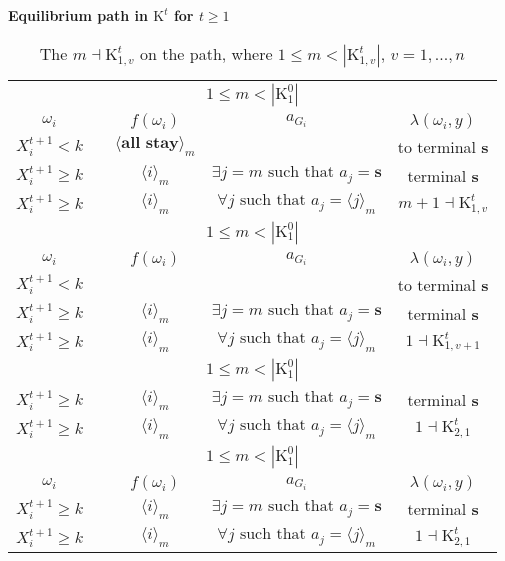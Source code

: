 \documentclass[12pt,letter]{article}
\newcommand{\Kappa}{\mathrm{K}}
\theoremstyle{definition}
\theoremstyle{remark}
\theoremstyle{claim}
\begin{document}
\noindent \textbf{Equilibrium path in $\Kappa^t$ for $t\geq 1$}
\begin{table}[!htbp]
\caption{The $m\dashv\Kappa^t_{1,v}$ on the path, where $1\leq m<|\Kappa^t_{1,v}|$, $v=1,...,n$}
\begin{center}
\begin{tabular}{c c | c | c | c}
\multicolumn{5}{c}{$1\leq m < |\Kappa^0_1|$}\\
$\omega_i$ 	 & 	   &	$f(\omega_i)$  &	$a_{G_i}$ & $\lambda(\omega_i,y)$ \\
\hline
\hline
$X^{t+1}_i<k$  	&                                & $\langle \textbf{all stay} \rangle_m$		&				 				& to terminal \textbf{s}\\
$X^{t+1}_i\geq k$  	& 						& $\langle i \rangle_m$		&  $\exists j=m\text{ such that } a_j=\textbf{s}$	& terminal \textbf{s}\\
$X^{t+1}_i\geq k$ 	& 						& $\langle i \rangle_m$		&  $\forall j\text{ such that } a_j= \langle j \rangle_m$	& $m+1\dashv \Kappa^t_{1,v}$\\
\hline
\multicolumn{5}{c}{$1\leq m < |\Kappa^0_1|$}\\
$\omega_i$ 	 & 	   &	$f(\omega_i)$  &	$a_{G_i}$ & $\lambda(\omega_i,y)$ \\
\hline
\hline
$X^{t+1}_i<k$  	&                                & 											&				 				& to terminal \textbf{s}\\
$X^{t+1}_i\geq k$ & 						& $\langle i \rangle_m$		&  $\exists j=m\text{ such that } a_j=\textbf{s}$	& terminal \textbf{s}\\
$X^{t+1}_i\geq k$ 	& 						& $\langle i \rangle_m$		&  $\forall j\text{ such that } a_j= \langle j \rangle_m$	& $1\dashv \Kappa^t_{1,v+1}$\\
\hline
\multicolumn{5}{c}{$1\leq m < |\Kappa^0_1|$}\\
\hline
\hline
$X^{t+1}_i\geq k$ 	& 						& $\langle i \rangle_m$		&  $\exists j=m\text{ such that } a_j=\textbf{s}$	& terminal \textbf{s}\\
$X^{t+1}_i\geq k$ & 						& $\langle i \rangle_m$		&  $\forall j\text{ such that } a_j= \langle j \rangle_m$	& $1\dashv \Kappa^t_{2,1}$\\
\hline
\multicolumn{5}{c}{$1\leq m < |\Kappa^0_1|$}\\
$\omega_i$ 	 & 	   &	$f(\omega_i)$  &	$a_{G_i}$ & $\lambda(\omega_i,y)$ \\
\hline
\hline
$X^{t+1}_i\geq k$ 	& 						& $\langle i \rangle_m$		&  $\exists j=m\text{ such that } a_j=\textbf{s}$	& terminal \textbf{s}\\
$X^{t+1}_i\geq k$ 	& 						& $\langle i \rangle_m$		&  $\forall j\text{ such that } a_j= \langle j \rangle_m$	& $1\dashv \Kappa^t_{2,1}$\\
\hline
\end{tabular}
\end{center}
\end{table}
\end{document}

